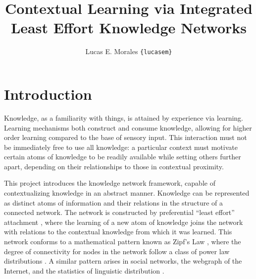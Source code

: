 \documentclass[11pt,letterpaper]{article}
\title{{\Large Contextual Learning via Integrated Least Effort Knowledge Networks}}
\author{Lucas E. Morales \texttt{\{lucasem\}}}
\date{}
\begin{document}
\maketitle

\section{Introduction}

Knowledge, as a familiarity with things, is attained by experience via
learning. Learning mechanisms both construct and consume knowledge, allowing
for higher order learning compared to the base of sensory input. This
interaction must not be immediately free to use all knowledge: a particular
context must motivate certain atoms of knowledge to be readily available
while setting others further apart, depending on their relationships to
those in contextual proximity.

This project introduces the knowledge network framework, capable of
contextualizing knowledge in an abstract manner. Knowledge can be
represented as distinct atoms of information and their relations in the
structure of a connected network. The network is constructed by preferential
``least effort'' attachment \cite{cancho03}, where the learning of a new
atom of knowledge joins the network with relations to the contextual
knowledge from which it was learned. This network conforms to a mathematical
pattern known as Zipf's Law \cite{zipf49}, where the degree of connectivity
for nodes in the network follow a class of power law distributions
\cite{barabasi99}. A similar pattern arises in social networks, the webgraph
of the Internet, and the statistics of linguistic distribution
\cite{clauset09}.

% 
\end{document}
